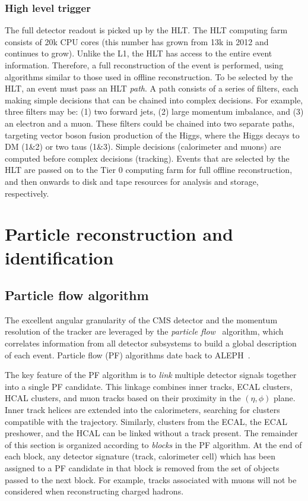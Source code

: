 \subsubsection{High level trigger}

The full detector readout is picked up by the HLT.
The HLT computing farm consists of 20k CPU cores (this number has grown from 13k in 2012 and continues to grow).
Unlike the L1, the HLT has access to the entire event information.
Therefore, a full reconstruction of the event is performed, using algorithms similar to those used in offline reconstruction.
To be selected by the HLT, an event must pass an HLT \emph{path}.
A path consists of a series of filters, each making simple decisions that can be chained into complex decisions.
For example, three filters may be: (1) two forward jets, (2) large momentum imbalance, and (3) an electron and a muon.
These filters could be chained into two separate paths, targeting vector boson fusion production of the Higgs, where the Higgs decays to DM (1\&2) or two taus (1\&3).
Simple decisions (calorimeter and muons) are computed before complex decisions (tracking).
Events that are selected by the HLT are passed on to the Tier 0 computing farm for full offline reconstruction, and then onwards to disk and tape resources for analysis and storage, respectively.



\section{Particle reconstruction and identification}

\subsection{Particle flow algorithm}

The excellent angular granularity of the CMS detector and the momentum resolution of the tracker are leveraged by the \emph{particle flow}~\cite{cmspf} algorithm, which correlates information from all detector subsystems to build a global description of each event.
Particle flow (PF) algorithms date back to ALEPH~\cite{alephpf}.

The key feature of the PF algorithm is to \emph{link} multiple detector signals together into a single PF candidate.
This linkage combines inner tracks, ECAL clusters, HCAL clusters, and muon tracks based on their proximity in the $(\eta,\phi)$ plane.
Inner track helices are extended into the calorimeters, searching for clusters compatible with the trajectory.
Similarly, clusters from the ECAL, the ECAL preshower, and the HCAL can be linked without a track present. 
The remainder of this section is organized according to \emph{blocks} in the PF algorithm.
At the end of each block, any detector signature (track, calorimeter cell) which has been assigned to a PF candidate in that block is removed from the set of objects passed to the next block.
For example, tracks associated with muons will not be considered when reconstructing charged hadrons. 

